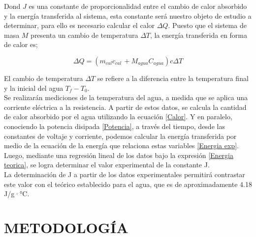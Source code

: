 \documentclass[10pt]{article}
\begin{document}
\begin{multicols*}{2}
Dond $J$ es una constante de proporcionalidad entre el cambio de calor absorbido y la energía transferida al sistema,
esta constante será nuestro objeto de estudio a determinar, para ello es necesario calcular el calor $\Delta Q$. Puesto que el sistema de masa $M$ presenta un cambio de temperatura $\Delta T$, la energía transferida en forma de calor es;

\begin{equation}
    \Delta Q = (m_{cal} c_{cal} \,+ M_{agua}C_{agua})c\Delta T
    \label{Calor}
\end{equation}


El cambio de temperatura $\Delta T$ se refiere a la diferencia entre la temperatura final y la inicial del agua $T_f-T_0$.\\

Se realizarán mediciones de la temperatura del agua, a medida que se aplica una corriente eléctrica a la resistencia. A partir de estos datos, se calcula la cantidad de calor absorbido por el agua utilizando la ecuación \ref{Calor}. Y en paralelo, conociendo la potencia disipada \ref{Potencia}, a través del tiempo, desde las constantes de voltaje y corriente, podemos calcular la energía transferida por medio de la ecuación de la energía que relaciona estas variables \ref{Energia exp}. Luego, mediante una regresión lineal de los datos bajo la expresión \ref{Energia teorica}, se logra determinar el valor experimental de la constante J.\\

 La determinación de J a partir de los datos experimentales permitirá contrastar este valor con el teórico establecido para el agua, que es de aproximadamente 4.18 J/g·°C.


\section{\small METODOLOGÍA}


\end{multicols*}
\end{document}
